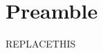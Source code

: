 \documentclass[oneside]{book}
\date{}
\author{Mattia Mascarello}
\begin{document}
	\maketitle
	
	\tableofcontents
\chapter{Preamble}
\blindtext
\newpage
REPLACETHIS
\end{document}

